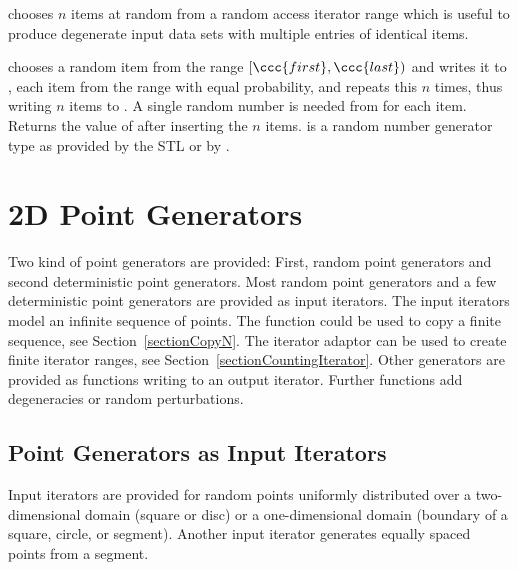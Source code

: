  chooses $n$ items at random from a random
access iterator range which is useful to produce degenerate input data
sets with multiple entries of identical items.


{ chooses a random item from the range $[\ccc{first},\ccc{last})$ and
    writes it to , each item from the range with equal
    probability, and repeats this $n$ times, thus writing $n$ items to
    .
    A single random number is needed from  for each item.
    Returns the value of  after inserting the $n$ items.
    \ccPrecond {} is a random number generator type as provided 
    by the STL or by .
}



\newpage
\section{2D Point Generators}

Two kind of point generators are provided: First, random point
generators and second deterministic point generators. Most random
point generators and a few deterministic point generators are provided
as input iterators.  The input iterators model an infinite sequence of
points. The function  could be used to copy a
finite sequence, see Section~\ref{sectionCopyN}. The iterator adaptor
 can be used to create finite iterator
ranges, see Section~\ref{sectionCountingIterator}.
Other generators are provided as functions writing to an output
iterator. Further functions add degeneracies or random perturbations.


\subsection{Point Generators as Input Iterators}

\ccDefinition

Input iterators are provided for random points uniformly distributed
over a two-dimensional domain (square or disc) or a one-dimensional
domain (boundary of a square, circle, or segment). Another input
iterator generates equally spaced points from a segment.

